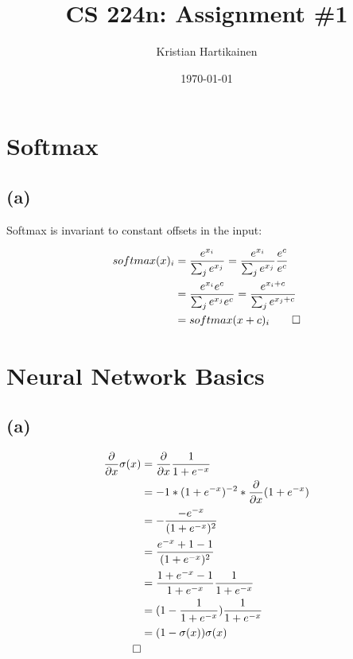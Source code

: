 \documentclass[11pt]{article}
\title{ CS 224n: Assignment \#1 }
\author{Kristian Hartikainen}
\date{\today}
\begin{document}
\maketitle

\section{Softmax}
\subsection*{(a)}
Softmax is invariant to constant offsets in the input:

\begin{equation*}
  \label{eq:softmax-constant-invariant}
  \begin{split}
    softmax(x)_{i} &= \frac{ e^{ x_{i} }       }{ \sum_{j}{ e^{ x_{j} }} }
                    = \frac{ e^{ x_{i} }       }{ \sum_{j}{ e^{ x_{j} }}} \frac{e^{c}}{{e^{c}}} \\
                 &= \frac{ e^{ x_{i} } e^{c} }{ \sum_{j}{ e^{ x_{j} } e^{c}}}
                  = \frac{ e^{ x_{i} + c }   }{ \sum_{j}{ e^{ x_{j} + c } } } \\
                 &= softmax(x + c)_{i}
  \qedhere
  \end{split}
\end{equation*}

\section{Neural Network Basics}
\subsection*{(a)}
\begin{equation*}
  \label{eq:sigmoid-gradient}
  \begin{split}
    \frac{ \partial }{ \partial x } \sigma(x)
      &= \frac{ \partial }{ \partial x } \frac{ 1 }{ 1 + e^{-x} } \\
      &= -1*(1 + e^{-x})^{-2} * \frac{ \partial }{ \partial x } (1+e^{-x}) \\
      &= -\frac{ -e^{-x} }{ (1 + e^{-x})^{2} } \\
      &=  \frac{ e^{-x} + 1 - 1 }{ (1 + e^{-x})^{2} } \\
      &=  \frac{ 1 + e^{-x} - 1 }{ 1 + e^{-x} } \frac{ 1 }{ 1 + e^{-x} } \\
      &=  (1 - \frac{ 1 }{ 1 + e^{-x} }) \frac{ 1 }{ 1 + e^{-x} } \\
      &=  (1 - \sigma(x)) \sigma(x) \\
  \qedhere
  \end{split}
\end{equation*}
\end{document}

